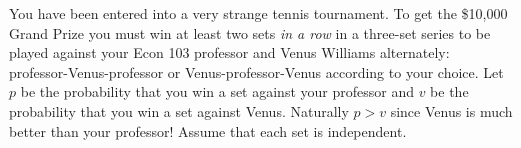 \documentclass[addpoints,12pt]{exam}\usepackage[]{graphicx}\usepackage[]{color}
\begin{document}
\begin{questions}
	 

\question You have been entered into a very strange tennis tournament. To get the \$10,000 Grand Prize you must win at least two sets \emph{in a row} in a three-set series to be played against your Econ 103 professor and Venus Williams alternately: professor-Venus-professor or Venus-professor-Venus according to your choice. Let $p$ be the probability that you win a set against your professor and $v$ be the probability that you win a set against Venus. Naturally $p>v$ since Venus is much better than your professor! Assume that each set is independent.
\end{questions}
\end{document}
